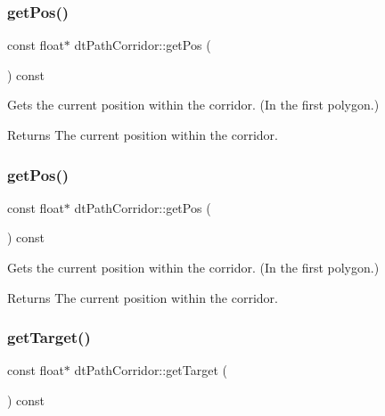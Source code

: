 \subsubsection{\texorpdfstring{get\+Pos()}{getPos()}\hspace{0.1cm}{\footnotesize\ttfamily [1/2]}}
{\footnotesize\ttfamily const float$\ast$ dt\+Path\+Corridor\+::get\+Pos (\begin{DoxyParamCaption}{ }\end{DoxyParamCaption}) const\hspace{0.3cm}{\ttfamily [inline]}}

Gets the current position within the corridor. (In the first polygon.) \begin{DoxyReturn}{Returns}
The current position within the corridor. 
\end{DoxyReturn}
\mbox{\label{classdtPathCorridor_a607e96864c9cb68386d57e90d8681159}} 
\subsubsection{\texorpdfstring{get\+Pos()}{getPos()}\hspace{0.1cm}{\footnotesize\ttfamily [2/2]}}
{\footnotesize\ttfamily const float$\ast$ dt\+Path\+Corridor\+::get\+Pos (\begin{DoxyParamCaption}{ }\end{DoxyParamCaption}) const\hspace{0.3cm}{\ttfamily [inline]}}

Gets the current position within the corridor. (In the first polygon.) \begin{DoxyReturn}{Returns}
The current position within the corridor. 
\end{DoxyReturn}
\mbox{\label{classdtPathCorridor_aa1ea66fedbbab0cabfb279287aee392b}} 
\subsubsection{\texorpdfstring{get\+Target()}{getTarget()}\hspace{0.1cm}{\footnotesize\ttfamily [1/2]}}
{\footnotesize\ttfamily const float$\ast$ dt\+Path\+Corridor\+::get\+Target (\begin{DoxyParamCaption}{ }\end{DoxyParamCaption}) const\hspace{0.3cm}{\ttfamily [inline]}}

